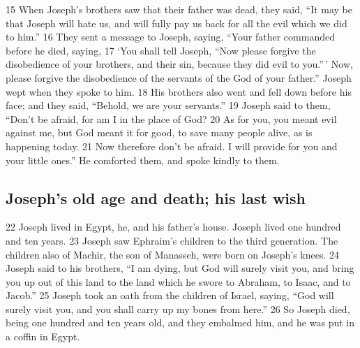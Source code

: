 {15} When Joseph's brothers saw that their father was dead, they said,
``It may be that Joseph will hate us, and will fully pay us back for all
the evil which we did to him.'' {16} They sent a message to Joseph,
saying, ``Your father commanded before he died, saying, {17} `You shall
tell Joseph, ``Now please forgive the disobedience of your brothers, and
their sin, because they did evil to you.''\,' Now, please forgive the
disobedience of the servants of the God of your father.'' Joseph wept
when they spoke to him. {18} His brothers also went and fell down before
his face; and they said, ``Behold, we are your servants.'' {19} Joseph
said to them, ``Don't be afraid, for am I in the place of God? {20} As
for you, you meant evil against me, but God meant it for good, to save
many people alive, as is happening today. {21} Now therefore don't be
afraid. I will provide for you and your little ones.'' He comforted
them, and spoke kindly to them.

\hypertarget{josephs-old-age-and-death-his-last-wish}{%
\subsection{Joseph's old age and death; his last
wish}\label{josephs-old-age-and-death-his-last-wish}}

{22} Joseph lived in Egypt, he, and his father's house. Joseph lived one
hundred and ten years. {23} Joseph saw Ephraim's children to the third
generation. The children also of Machir, the son of Manasseh, were born
on Joseph's knees. {24} Joseph said to his brothers, ``I am dying, but
God will surely visit you, and bring you up out of this land to the land
which he swore to Abraham, to Isaac, and to Jacob.'' {25} Joseph took an
oath from the children of Israel, saying, ``God will surely visit you,
and you shall carry up my bones from here.'' {26} So Joseph died, being
one hundred and ten years old, and they embalmed him, and he was put in
a coffin in Egypt.
